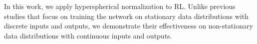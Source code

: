 In this work, we apply hyperspherical normalization to RL. Unlike previous studies that focus on training the network on stationary data distributions with discrete inputs and outputs, we demonstrate their effectiveness on non-stationary data distributions with continuous inputs and outputs.

